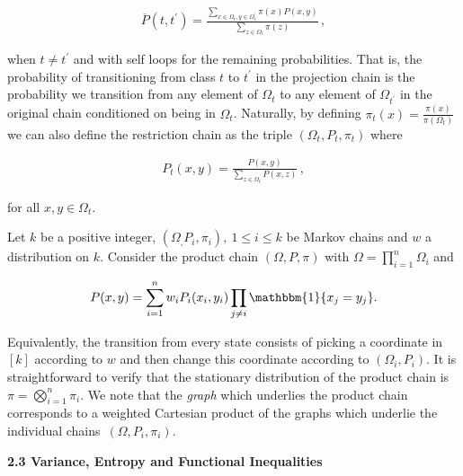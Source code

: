\documentclass[10pt,a4paper]{article}
\begin{document}
\[\begin{gathered}
\overline{P}(t,t^{\prime})=\frac{\sum_{x\in\Omega_{t},y\in\Omega_{t}^{\prime}}\pi(x)P(x,y)}{\sum_{z\in\Omega_{t}}\pi(z)}\,,
\end{gathered}\]


when $t\neq t^{\prime}$ and with self loops for the remaining probabilities.
That is, the probability of transitioning from class $t$ to $t^{\prime}$ in the projection chain is the probability we transition from any element of $\Omega_{t}$ to any element of $\Omega_{t^{\prime}}$ in the original chain conditioned on being in $\Omega_{t}$. Naturally, by defining
$\pi_{t}(x)=\frac{\pi(x)}{\pi(\Omega_{t})}$
we can also define the restriction chain as the triple $(\Omega_{t},P_{t},\pi_{t})$ where\par


\[\begin{gathered}
P_{t}(x,y)=\frac{P(x,y)}{\sum_{z\in\Omega_{t}}P(x,z)}\,,
\end{gathered}\]


for all $x,y\in\Omega_{t}$.\par




Let $k$ be a positive integer, $(\Omega_{,}P_{i},\pi_{i}),\ 1\leq i\leq k$ be Markov chains and $w$ a distribution on $k$. Consider the product chain $(\Omega,P,\pi)$ with $\Omega=\prod_{i=1}^{n}\Omega_{i}$ and\par


\[\begin{gathered}
P(x,y)=\sum_{i=1}^{n}w_{i}P_{i}(x_{i},y_{i})\prod_{j\neq i}\mathbbm{1}\{x_{j}=y_{j}\}.
\end{gathered}\]


Equivalently, the transition from every state consists of picking a coordinate in $[k]$ according to $w$ and then change this coordinate according to $(\Omega_{i},P_{i})$. It is straightforward to verify that the stationary distribution of the product chain is $\pi=\bigotimes_{i=1}^{n}\pi_{i}$. We note that the \emph{graph} which underlies the product chain corresponds to a weighted Cartesian product of the graphs which underlie the individual chains $(\Omega,P_{i},\pi_{i})$.\par





\par\medskip\noindent\textbf{2.3 Variance, Entropy and Functional Inequalities}\par
\end{document}
